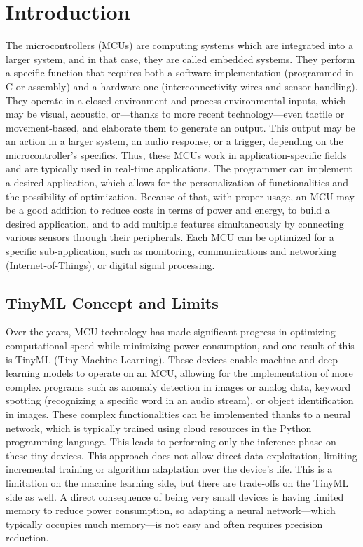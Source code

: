 \chapter{Introduction}
\label{cha:intro}
The microcontrollers (MCUs) are computing systems which are integrated into a larger system, and in that case, they are called embedded systems. They perform a specific function that requires both a software implementation (programmed in C or assembly) and a hardware one (interconnectivity wires and sensor handling).  
They operate in a closed environment and process environmental inputs, which may be visual, acoustic, or—thanks to more recent technology—even tactile or movement-based, and elaborate them to generate an output. This output may be an action in a larger system, an audio response, or a trigger, depending on the microcontroller's specifics.  
Thus, these MCUs work in application-specific fields and are typically used in real-time applications.  
The programmer can implement a desired application, which allows for the personalization of functionalities and the possibility of optimization. Because of that, with proper usage, an MCU may be a good addition to reduce costs in terms of power and energy, to build a desired application, and to add multiple features simultaneously by connecting various sensors through their peripherals.  
Each MCU can be optimized for a specific sub-application, such as monitoring, communications and networking (Internet-of-Things), or digital signal processing.

\section{TinyML Concept and Limits}
\label{sec:context}                                                                      
Over the years, MCU technology has made significant progress in optimizing computational speed while minimizing power consumption, and one result of this is TinyML (Tiny Machine Learning). These devices enable machine and deep learning models to operate on an MCU, allowing for the implementation of more complex programs such as anomaly detection in images or analog data, keyword spotting (recognizing a specific word in an audio stream), or object identification in images.  
These complex functionalities can be implemented thanks to a neural network, which is typically trained using cloud resources in the Python programming language. This leads to performing only the inference phase on these tiny devices. This approach does not allow direct data exploitation, limiting incremental training or algorithm adaptation over the device's life. This is a limitation on the machine learning side, but there are trade-offs on the TinyML side as well. A direct consequence of being very small devices is having limited memory to reduce power consumption, so adapting a neural network—which typically occupies much memory—is not easy and often requires precision reduction.

